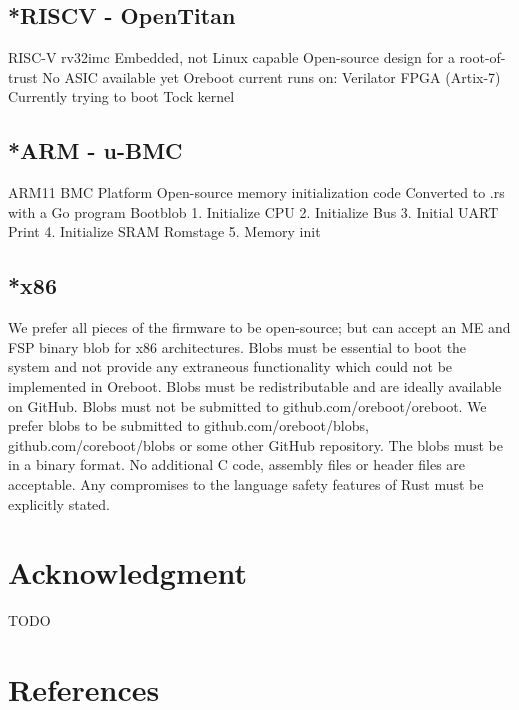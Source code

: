 \documentclass[conference]{IEEEtran}
\begin{document}
\subsection{*RISCV - OpenTitan}

RISC-V rv32imc
Embedded, not Linux capable
Open-source design for a root-of-trust
No ASIC available yet
Oreboot current runs on:
Verilator
FPGA (Artix-7)
Currently trying to boot Tock kernel

\subsection{*ARM - u-BMC}

ARM11
BMC Platform
Open-source memory initialization code
Converted to .rs with a Go program
Bootblob
1. Initialize CPU
2. Initialize Bus
3. Initial UART Print
4. Initialize SRAM
Romstage
5. Memory init


\subsection{*x86}

We prefer all pieces of the firmware to be open-source; but can accept an ME and FSP binary blob for x86 architectures.
Blobs must be essential to boot the system and not provide any extraneous functionality which could not be implemented in Oreboot.
Blobs must be redistributable and are ideally available on GitHub.
Blobs must not be submitted to github.com/oreboot/oreboot. We prefer blobs to be submitted to github.com/oreboot/blobs, github.com/coreboot/blobs or some other GitHub repository.
The blobs must be in a binary format. No additional C code, assembly files or header files are acceptable.
Any compromises to the language safety features of Rust must be explicitly stated.


\section*{Acknowledgment}

TODO

\section*{References}




\vspace{12pt}
\end{document}
